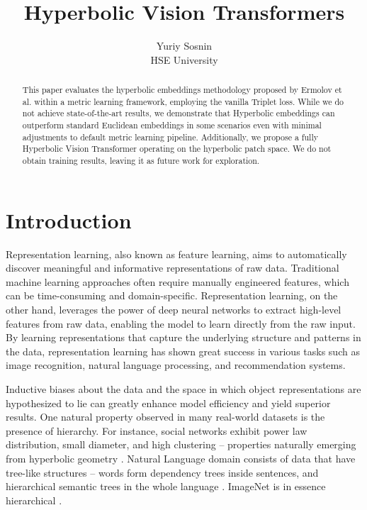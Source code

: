 \documentclass[10pt, letterpaper, twocolumn]{article}
\begin{document}
\title{Hyperbolic Vision Transformers}
\author{Yuriy Sosnin\\HSE University}
\maketitle

\begin{abstract}
This paper evaluates the hyperbolic embeddings methodology proposed by Ermolov et al. \cite{ermolov_hyperbolic_2022} within a metric learning framework, employing the vanilla Triplet loss. While we do not achieve state-of-the-art results, we demonstrate that Hyperbolic embeddings can outperform standard Euclidean embeddings in some scenarios even with minimal adjustments to default metric learning pipeline. Additionally, we propose a fully Hyperbolic Vision Transformer operating on the hyperbolic patch space. We do not obtain training results, leaving it as future work for exploration.
\end{abstract}

\newcommand{\dotproduct}[1]{\langle #1 \rangle}
\newcommand{\norm}[1]{\lVert #1 \rVert}
\newcommand{\sbrakets}[1]{\left( #1 \right)}

\section{Introduction}

Representation learning, also known as feature learning, aims to automatically discover meaningful and informative representations of raw data. Traditional machine learning approaches often require manually engineered features, which can be time-consuming and domain-specific. Representation learning, on the other hand, leverages the power of deep neural networks to extract high-level features from raw data, enabling the model to learn directly from the raw input. By learning representations that capture the underlying structure and patterns in the data, representation learning has shown great success in various tasks such as image recognition, natural language processing, and recommendation systems.

Inductive biases about the data and the space in which object representations are hypothesized to lie can greatly enhance model efficiency and yield superior results. One natural property observed in many real-world datasets is the presence of hierarchy. For instance, social networks exhibit power law distribution, small diameter, and high clustering -- properties naturally emerging from hyperbolic geometry \cite{clauset_hierarchical_2008, krioukov_hyperbolic_2010}. Natural Language domain consists of data that have tree-like structures -- words form dependency trees inside sentences, and hierarchical semantic trees in the whole language \cite{tifrea_Poincare_2018}. ImageNet is in essence hierarchical \cite{deng_imagenet_2009}.
\end{document}
